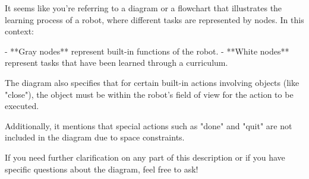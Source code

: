 It seems like you're referring to a diagram or a flowchart that illustrates the learning process of a robot, where different tasks are represented by nodes. In this context:

- **Gray nodes** represent built-in functions of the robot.
- **White nodes** represent tasks that have been learned through a curriculum.

The diagram also specifies that for certain built-in actions involving objects (like "close"), the object must be within the robot's field of view for the action to be executed. 

Additionally, it mentions that special actions such as "done" and "quit" are not included in the diagram due to space constraints.

If you need further clarification on any part of this description or if you have specific questions about the diagram, feel free to ask!
